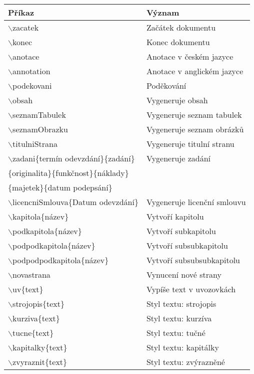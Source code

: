 \documentclass[a4paper, 12pt]{report}
\begin{document}
	\begin{table}
		\centering
		\begin{tabular}{ll}	
			\toprule[1.5pt]
			Příkaz & Význam\\
			\midrule
			$\backslash$zacatek & Začátek dokumentu\\
			$\backslash$konec & Konec dokumentu\\
			$\backslash$anotace & Anotace v českém jazyce\\
			$\backslash$annotation & Anotace v anglickém jazyce\\
			$\backslash$podekovani & Poděkování\\
			$\backslash$obsah & Vygeneruje obsah\\
			$\backslash$seznamTabulek & Vygeneruje seznam tabulek\\
			$\backslash$seznamObrazku & Vygeneruje seznam obrázků\\
			$\backslash$titulniStrana & Vygeneruje titulní stranu\\
			$\backslash$zadani$\{$termín odevzdání$\}\{$zadání$\}$ & Vygeneruje zadání\\
			$\{$originalita$\}\{$funkčnost$\}\{$náklady$\}$\\
			$\{$majetek$\}\{$datum podepsání$\}$\\
			$\backslash$licencniSmlouva$\{$Datum odevzdání$\}$ & Vygeneruje licenční smlouvu\\
			$\backslash$kapitola$\{$název$\}$ & Vytvoří kapitolu\\
			$\backslash$podkapitola$\{$název$\}$ & Vytvoří subkapitolu\\	
			$\backslash$podpodkapitola$\{$název$\}$ & Vytvoří subsubkapitolu\\
			$\backslash$podpodpodkapitola$\{$název$\}$ & Vytvoří subsubsubkapitolu\\
			$\backslash$novastrana & Vynucení nové strany\\
			$\backslash$uv$\{$text$\}$ & Vypíše text v uvozovkách\\
			$\backslash$strojopis$\{$text$\}$ & Styl textu: strojopis\\
			$\backslash$kurziva$\{$text$\}$ & Styl textu: kurzíva\\
			$\backslash$tucne$\{$text$\}$ & Styl textu: tučné\\
			$\backslash$kapitalky$\{$text$\}$ & Styl textu: kapitálky\\
			$\backslash$zvyraznit$\{$text$\}$ & Styl textu: zvýrazněné\\
			\bottomrule[1,5pt]
		\end{tabular}
	\end{table}
	
\end{document}
